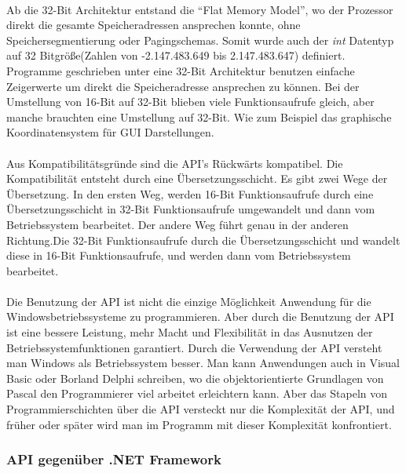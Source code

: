 \paragraph{}
Ab die 32-Bit Architektur entstand die "`Flat Memory Model"', wo der Prozessor direkt die gesamte Speicheradressen ansprechen konnte, ohne Speichersegmentierung oder Pagingschemas. Somit wurde auch der \textit{int} Datentyp auf 32 Bitgröße(Zahlen von -2.147.483.649 bis 2.147.483.647) definiert. Programme geschrieben unter eine 32-Bit Architektur benutzen einfache Zeigerwerte um direkt die Speicheradresse ansprechen zu können. Bei der Umstellung von 16-Bit auf 32-Bit blieben viele Funktionsaufrufe gleich, aber manche brauchten eine Umstellung auf 32-Bit. Wie zum Beispiel das graphische Koordinatensystem für GUI Darstellungen.
\paragraph{}
 Aus Kompatibilitätsgründe sind die API's Rückwärts kompatibel. Die Kompatibilität entsteht durch eine Übersetzungsschicht. Es gibt zwei Wege der Übersetzung. In den ersten Weg, werden 16-Bit Funktionsaufrufe durch eine Übersetzungsschicht in 32-Bit Funktionsaufrufe umgewandelt und dann vom Betriebssystem bearbeitet. Der andere Weg führt genau in der anderen Richtung.Die 32-Bit Funktionsaufrufe durch die Übersetzungsschicht und wandelt diese in 16-Bit Funktionsaufrufe, und werden dann vom Betriebssystem bearbeitet.
\paragraph{}
Die Benutzung der API ist nicht die einzige Möglichkeit Anwendung für die Windowsbetriebssysteme zu programmieren. Aber durch die Benutzung der API ist eine bessere Leistung, mehr Macht und Flexibilität in das Ausnutzen der Betriebssystemfunktionen garantiert. Durch die Verwendung der API versteht man Windows als Betriebssystem besser. Man kann Anwendungen auch in Visual Basic oder Borland Delphi schreiben, wo die objektorientierte Grundlagen von Pascal den Programmierer viel arbeitet erleichtern kann. Aber das Stapeln von Programmierschichten über die API versteckt nur die Komplexität der API, und früher oder später wird man im Programm mit dieser Komplexität konfrontiert.


\subsubsection{API gegenüber .NET Framework}
